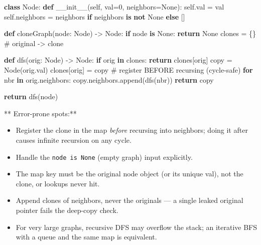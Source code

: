 \documentclass[11pt]{article}
\providecommand{\tightlist}{\setlength{\itemsep}{1pt}\setlength{\parskip}{0pt}}
\newenvironment{Shaded}{\begin{snugshade}}{\end{snugshade}}
\newcommand{\CommentTok}[1]{\textcolor[rgb]{0.48,0.49,0.49}{#1}}
\newcommand{\ControlFlowTok}[1]{\textcolor[rgb]{0.99,0.74,0.29}{\textbf{#1}}}
\newcommand{\DecValTok}[1]{\textcolor[rgb]{0.96,0.45,0.00}{#1}}
\newcommand{\FunctionTok}[1]{\textcolor[rgb]{0.56,0.27,0.68}{#1}}
\newcommand{\KeywordTok}[1]{\textcolor[rgb]{0.81,0.81,0.76}{\textbf{#1}}}
\newcommand{\NormalTok}[1]{\textcolor[rgb]{0.81,0.81,0.76}{#1}}
\newcommand{\OperatorTok}[1]{\textcolor[rgb]{0.81,0.81,0.76}{#1}}
\newcommand{\StringTok}[1]{\textcolor[rgb]{0.96,0.31,0.31}{#1}}
\newcommand{\VariableTok}[1]{\textcolor[rgb]{0.15,0.68,0.68}{#1}}
\begin{document}

\begin{Shaded}
\begin{Highlighting}[]
\KeywordTok{class}\NormalTok{ Node:}
    \KeywordTok{def} \FunctionTok{\_\_init\_\_}\NormalTok{(}\VariableTok{self}\NormalTok{, val}\OperatorTok{=}\DecValTok{0}\NormalTok{, neighbors}\OperatorTok{=}\VariableTok{None}\NormalTok{):}
        \VariableTok{self}\NormalTok{.val }\OperatorTok{=}\NormalTok{ val}
        \VariableTok{self}\NormalTok{.neighbors }\OperatorTok{=}\NormalTok{ neighbors }\ControlFlowTok{if}\NormalTok{ neighbors }\KeywordTok{is} \KeywordTok{not} \VariableTok{None} \ControlFlowTok{else}\NormalTok{ []}

\KeywordTok{def}\NormalTok{ cloneGraph(node: }\StringTok{\textquotesingle{}Node\textquotesingle{}}\NormalTok{) }\OperatorTok{{-}\textgreater{}} \StringTok{\textquotesingle{}Node\textquotesingle{}}\NormalTok{:}
    \ControlFlowTok{if}\NormalTok{ node }\KeywordTok{is} \VariableTok{None}\NormalTok{:}
        \ControlFlowTok{return} \VariableTok{None}
\NormalTok{    clones }\OperatorTok{=}\NormalTok{ \{\}  }\CommentTok{\# original {-}\textgreater{} clone}

    \KeywordTok{def}\NormalTok{ dfs(orig: }\StringTok{\textquotesingle{}Node\textquotesingle{}}\NormalTok{) }\OperatorTok{{-}\textgreater{}} \StringTok{\textquotesingle{}Node\textquotesingle{}}\NormalTok{:}
        \ControlFlowTok{if}\NormalTok{ orig }\KeywordTok{in}\NormalTok{ clones:}
            \ControlFlowTok{return}\NormalTok{ clones[orig]}
\NormalTok{        copy }\OperatorTok{=}\NormalTok{ Node(orig.val)}
\NormalTok{        clones[orig] }\OperatorTok{=}\NormalTok{ copy          }\CommentTok{\# register BEFORE recursing (cycle{-}safe)}
        \ControlFlowTok{for}\NormalTok{ nbr }\KeywordTok{in}\NormalTok{ orig.neighbors:}
\NormalTok{            copy.neighbors.append(dfs(nbr))}
        \ControlFlowTok{return}\NormalTok{ copy}

    \ControlFlowTok{return}\NormalTok{ dfs(node)}
\end{Highlighting}
\end{Shaded}

** Error-prone spots:**

\begin{itemize}
\tightlist
\item
  Register the clone in the map \emph{before} recursing into neighbors; doing it after causes infinite recursion on any cycle.
\item
  Handle the \texttt{node\ is\ None} (empty graph) input explicitly.
\item
  The map key must be the original node object (or its unique val), not the clone, or lookups never hit.
\item
  Append clones of neighbors, never the originals --- a single leaked original pointer fails the deep-copy check.
\item
  For very large graphs, recursive DFS may overflow the stack; an iterative BFS with a queue and the same map is equivalent.
\end{itemize}
\end{document}
